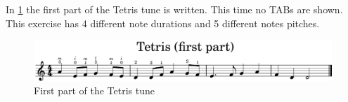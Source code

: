 In \ref{fig:ukulele_tetris_simple_first_part} the first part of the Tetris tune is written. This time no TABs are shown. This exercise has 4 different note durations and 5 different notes pitches.

\begin{figure}[h]
	\centering
	\includegraphics[width=\textwidth]{../MuseScore/Ukulele/UkuleleTetrisSimpleFirstPart.png}
	\caption{First part of the Tetris tune}
	\label{fig:ukulele_tetris_simple_first_part}
\end{figure}


